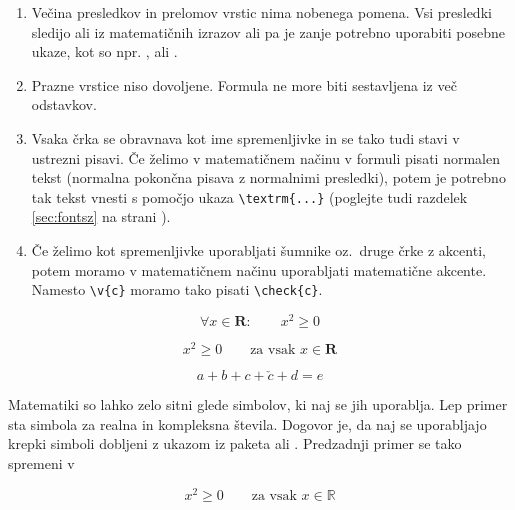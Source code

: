 \begin{enumerate}

\item Večina presledkov in prelomov vrstic nima nobenega pomena. Vsi presledki sledijo ali 
iz matematičnih izrazov ali pa je zanje potrebno uporabiti posebne ukaze, kot so npr.
\ci{,},  ali .
 
\item Prazne vrstice niso dovoljene. Formula ne more biti sestavljena iz več odstavkov.

\item Vsaka črka se obravnava kot ime spremenljivke in se tako tudi stavi v ustrezni pisavi.
Če želimo v matematičnem načinu v formuli pisati normalen tekst (normalna pokončna 
pisava z normalnimi presledki), potem je potrebno tak tekst vnesti s pomočjo ukaza
\verb|\textrm{...}|  (poglejte tudi razdelek \ref{sec:fontsz} na strani \pageref{sec:fontsz}).

\item Če želimo kot spremenljivke uporabljati šumnike oz.~druge črke z akcenti, potem
  moramo v matematičnem načinu uporabljati matematične akcente. Namesto 
  \verb|\v{c}| moramo tako pisati \verb|\check{c}|.
\end{enumerate}
\begin{example}
\begin{equation}
\forall x \in \mathbf{R}:
\qquad x^{2} \geq 0
\end{equation}
\end{example}
\begin{example}
\begin{equation}
x^{2} \geq 0\qquad
\textrm{za vsak }x\in\mathbf{R}
\end{equation}
\end{example}
\begin{example}
\begin{equation}
a+b+c+\check{c}+d=e
\end{equation}
\end{example}

%
%
Matematiki so lahko zelo sitni glede simbolov, ki naj se jih uporablja.
Lep primer sta simbola za realna in kompleksna števila. Dogovor je,
da naj se uporabljajo krepki simboli dobljeni z ukazom 
 iz paketa  ali .
\ifx\mathbb\undefined\else
Predzadnji primer se tako spremeni v 
\begin{example}
\begin{displaymath}
x^{2} \geq 0\qquad
\textrm{za vsak }x\in\mathbb{R}
\end{displaymath}
\end{example}
\fi


